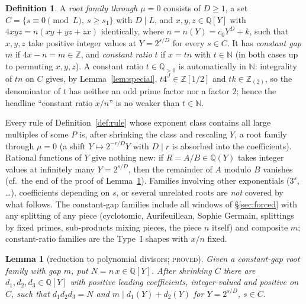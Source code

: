 \documentclass[11pt,reqno]{amsart}
\newtheorem{lemma}[theorem]{Lemma}
\theoremstyle{definition}
\newtheorem{definition}[theorem]{Definition}
\newcommand{\Z}{\mathbb Z}
\newcommand{\Q}{\mathbb Q}
\newcommand{\N}{\mathbb N}
\newcommand{\status}[1]{\textup{\textsc{#1}}}
\begin{document}
\begin{definition}\label{def:rootfamily}
A \emph{root family through $\mu=0$} consists of $D\ge1$, a set
$C=\{s\equiv0\pmod L,\ s\ge s_1\}$ with $D\mid L$, and $x,y,z\in\Q[Y]$ with
$4xyz=n(xy+yz+zx)$ identically, where $n=n(Y)=c_0Y^D+k$, such that
$x,y,z$ take positive integer values at $Y=2^{s/D}$ for every $s\in C$.  It
has \emph{constant gap} $m$ if $4x-n=m\in\Z$, and \emph{constant ratio} $t$
if $x=tn$ with $t\in\N$ (in both cases up to permuting $x,y,z$).  A constant
ratio $t\in\Q_{>0}$ is automatically in $\N$: integrality of $tn$ on $C$
gives, by Lemma~\ref{lem:special}, $t4^J\in\Z[1/2]$ and $tk\in\Z_{(2)}$, so
the denominator of $t$ has neither an odd prime factor nor a factor $2$;
hence the headline ``constant ratio $x/n$'' is no weaker than $t\in\N$.%
\end{definition}

Every rule of Definition~\ref{def:rule} whose exponent class contains all
large multiples of some $P$ is, after shrinking the class and rescaling
$Y$, a root family through $\mu=0$ (a shift $Y\mapsto 2^{-r/D}Y$ with
$D\mid r$ is absorbed into the coefficients).  Rational functions of $Y$
give nothing new: if $R=A/B\in\Q(Y)$ takes integer values at infinitely many
$Y=2^{s/D}$, then the remainder of $A$ modulo $B$ vanishes (cf.\ the end of
the proof of Lemma~\ref{lem:reduce}).  Families involving other exponentials
($3^s$, \dots), coefficients depending on $s$, or several unrelated roots are
\emph{not} covered by what follows.  The constant-gap families include all
windows of \S\ref{sec:forced} with any splitting of any piece (cyclotomic,
Aurifeuillean, Sophie Germain, splittings by fixed primes, sub-products
mixing pieces, the piece $n$ itself) and composite $m$; constant-ratio
families are the Type~I shapes with $x/n$ fixed.

\begin{lemma}[reduction to polynomial divisors; \status{proved}]\label{lem:reduce}
Given a constant-gap root family with gap $m$, put $N=n\,x\in\Q[Y]$.  After
shrinking $C$ there are $d_1,d_2,d_3\in\Q[Y]$ with positive leading
coefficients, integer-valued and positive on $C$, such that
$d_1d_2d_3=N$ and $m\mid d_1(Y)+d_2(Y)$ for $Y=2^{s/D}$, $s\in C$.
\end{lemma}
\end{document}
